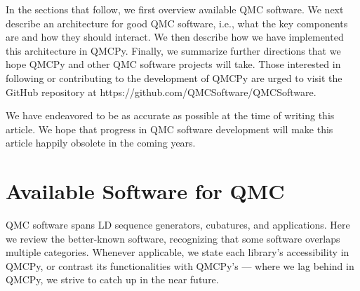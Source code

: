 \documentclass[graybox]{svmult}
\begin{document}
In the sections that follow, we first overview available QMC software.  We next describe an architecture for good QMC software, i.e., what the key components are and how they should interact.  We then describe how we have implemented this architecture in QMCPy.  Finally, we summarize further directions that we hope QMCPy and other QMC software projects will take.  Those interested in following or contributing to the development of QMCPy are urged to visit the GitHub repository at https://github.com/QMCSoftware/QMCSoftware.


We have endeavored to be as accurate as possible at the time of writing this article.  We hope that progress in QMC software development will make this article happily obsolete in the coming years.

\section{Available Software for QMC} \label{sec:available} 
QMC software spans  LD sequence generators, cubatures, and applications.  Here we review the better-known software, recognizing that some software overlaps multiple categories. Whenever applicable, we state each library's accessibility in QMCPy, or contrast its functionalities with QMCPy's --- where we lag behind in QMCPy, we strive to catch up in the near future.
\end{document}
